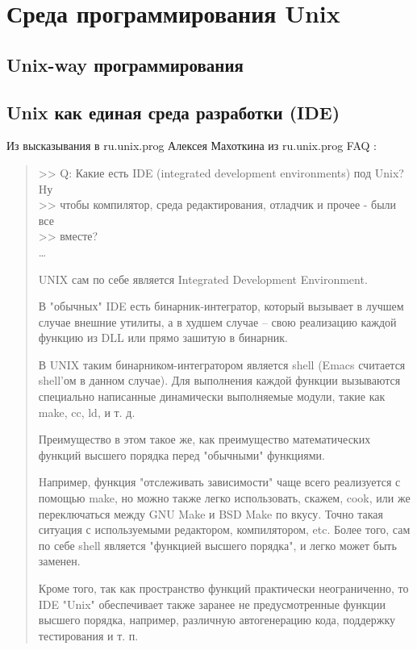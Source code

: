 \chapter{Среда программирования Unix}

\section{Unix-way программирования}

\section{Unix как единая среда разработки (IDE)}
Из высказывания в ru.unix.prog  Алексея Махоткина из ru.unix.prog FAQ :
\begin{quote}
 >> Q: Какие есть IDE (integrated development environments) под Unix?  Hу\\
 >> чтобы компилятор, среда редактирования, отладчик и прочее - были все\\
 >> вместе?\\
 
\dots

UNIX сам по себе является Integrated Development Environment.

В "обычных" IDE есть бинарник-интегратор, который вызывает в лучшем случае
внешние утилиты, а в худшем случае -- свою реализацию каждой функцию из DLL
или прямо зашитую в бинарник.

В UNIX таким бинарником-интегратором является shell (Emacs считается
shell'ом в данном случае).  Для выполнения каждой функции вызываются
специально написанные динамически выполняемые модули, такие как make, cc,
ld, и т. д.

Преимущество в этом такое же, как преимущество математических функций
высшего порядка перед "обычными" функциями.

Hапример, функция "отслеживать зависимости" чаще всего реализуется с
помощью make, но можно также легко использовать, скажем, cook, или же
переключаться между GNU Make и BSD Make по вкусу.  Точно такая ситуация с
используемыми редактором, компилятором, etc.  Более того, сам по себе shell
является "функцией высшего порядка", и легко может быть заменен.

Кроме того, так как пространство функций практически неограниченно, то IDE
"Unix" обеспечивает также заранее не предусмотренные функции высшего
порядка, например, различную автогенерацию кода, поддержку тестирования и
т. п.
\end{quote}

